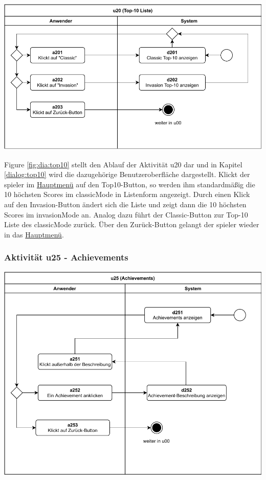 \vspace*{1cm}

\includegraphics[width=\linewidth]{diagramme/pdf/UML-Activity-u20.pdf}
\label{fig:dia:top10}
\vspace*{0.5cm}

Figure \ref{fig:dia:top10} stellt den Ablauf der Aktivität u20 dar und in Kapitel \ref{dialog:top10} wird die dazugehörige Benutzeroberfläche dargestellt.
Klickt der \gls{spieler} im \hyperref[fig:dia:mainMenu]{Hauptmenü} auf den \gls{Top10}-Button, so werden ihm standardmäßig die 10 höchsten Scores im \gls{classicMode} in Listenform angezeigt. Durch einen Klick auf den Invasion-Button ändert sich die Liste und zeigt dann die 10 höchsten Scores im \gls{invasionMode} an. Analog dazu führt der Classic-Button zur Top-10 Liste des \gls{classicMode} zurück.
Über den Zurück-Button gelangt der \gls{spieler} wieder in das \hyperref[fig:dia:mainMenu]{Hauptmenü}.

\clearpage

\subsubsection{Aktivität u25 - Achievements}

\vspace*{1cm}

\includegraphics[width=\linewidth]{diagramme/pdf/UML-Activity-u25.pdf}
\label{fig:dia:achievements}
\vspace*{0.5cm}

